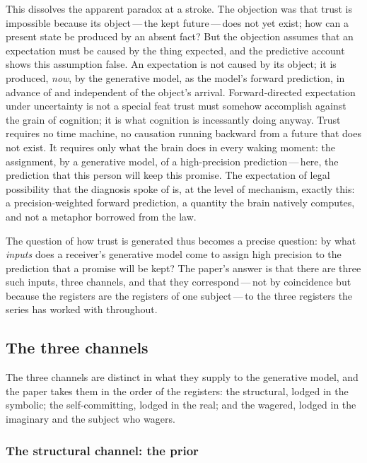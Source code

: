 This dissolves the apparent paradox at a stroke. The objection was that trust is impossible because its object\,---\,the kept future\,---\,does not yet exist; how can a present state be produced by an absent fact? But the objection assumes that an expectation must be caused by the thing expected, and the predictive account shows this assumption false. An expectation is not caused by its object; it is produced, \emph{now}, by the generative model, as the model's forward prediction, in advance of and independent of the object's arrival. Forward-directed expectation under uncertainty is not a special feat trust must somehow accomplish against the grain of cognition; it is what cognition is incessantly doing anyway. Trust requires no time machine, no causation running backward from a future that does not exist. It requires only what the brain does in every waking moment: the assignment, by a generative model, of a high-precision prediction\,---\,here, the prediction that this person will keep this promise.  The expectation of legal possibility that the diagnosis spoke of is, at the level of mechanism, exactly this: a precision-weighted forward prediction, a quantity the brain natively computes, and not a metaphor borrowed from the law.

The question of how trust is generated thus becomes a precise question: by what \emph{inputs} does a receiver's generative model come to assign high precision to the prediction that a promise will be kept? The paper's answer is that there are three such inputs, three channels, and that they correspond\,---\,not by coincidence but because the registers are the registers of one subject\,---\,to the three registers the series has worked with throughout.

\subsection{The three channels}
\label{p13:sub:mech-channels}

The three channels are distinct in what they supply to the generative model, and the paper takes them in the order of the registers: the structural, lodged in the symbolic; the self-committing, lodged in the real; and the wagered, lodged in the imaginary and the subject who wagers.

\subsubsection{The structural channel: the prior}
\label{p13:sub:mech-prior}

